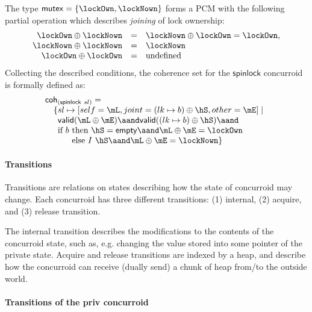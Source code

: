 The type $\mathsf{mutex} = \{\lockOwn, \lockNown\}$ forms a PCM with
the following partial operation which describes \emph{joining} of lock
ownership:
\[
\begin{array}{rcl}
\lockOwn \oplus \lockNown & = & \lockNown \oplus \lockOwn = \lockOwn,\\
\lockNown \oplus \lockNown & = & \lockNown\\
\lockOwn \oplus \lockOwn & = & \mbox{undefined}
\end{array}
\]
Collecting the described conditions, the coherence set for the
$\mathsf{spinlock}$ concurroid is formally defined as:
\[
\begin{array}{l}
\mathsf{coh}_{(\mathsf{spinlock}\ sl)} = \\
\quad \{\!\!\!\begin{array}[t]{l}
  sl \mapsto [self = \mL, joint = (lk \mapsto b) \oplus \hS, other = \mE] \mid \\
  \mathsf{valid} (\mL \oplus \mE) \aand \mathsf{valid} ((lk \mapsto b) \oplus \hS) \aand \hbox{}\\
  \mbox{if}\ b\ \!\!\!\begin{array}[t]{l}
            \mbox{then}\ \hS = \mathsf{empty} \aand \mL \oplus \mE = \lockOwn\\
            \mbox{else}\ I\ \hS \aand \mL \oplus \mE = \lockNown\}
            \end{array}
  \end{array}
\end{array}
\]

\paragraph{Transitions}

Transitions are relations on states describing how the state of
concurroid may change. Each concurroid has three different
transitions: (1) internal, (2) acquire, and (3) release transition.

The internal transition describes the modifications to the contents of
the concurroid state, such as, e.g. changing the value stored into
some pointer of the private state. Acquire and release transitions are
indexed by a heap, and describe how the concurroid can receive (dually
send) a chunk of heap from/to the outside world.

\paragraph{Transitions of the priv concurroid}

